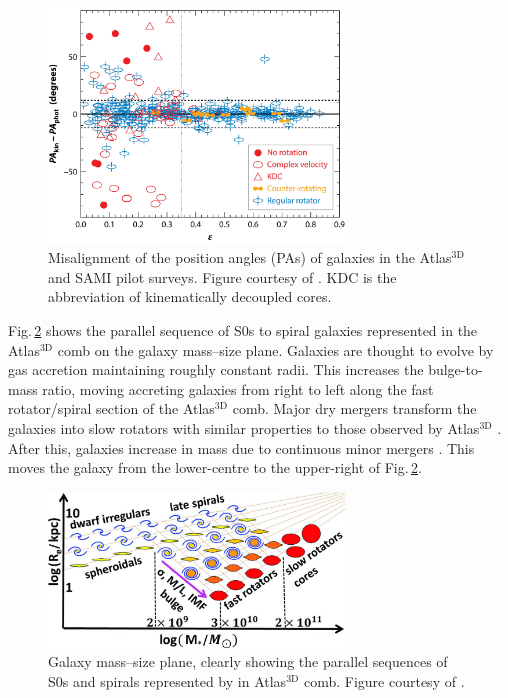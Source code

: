 	\begin{figure}
		\centering
		\includegraphics[width=0.7\textwidth]{introduction/misalignment.jpg}
		\caption[The kinematic--photometric misalignment in slow rotators]{Misalignment of the position angles (PAs) of galaxies in the Atlas$^\text{3D}$ and SAMI pilot surveys. Figure courtesy of \citet{Cappellari2016}. KDC is the abbreviation of kinematically decoupled cores.}
		\label{fig:Misalignment}
	\end{figure}

	Fig.\,\ref{fig:MassRe} shows the parallel sequence of S0s to spiral galaxies represented in the Atlas$^\text{3D}$ comb on the galaxy mass--size plane. Galaxies are thought to evolve by gas accretion maintaining roughly constant radii. This increases the bulge-to-mass ratio, moving accreting galaxies from right to left along the fast rotator/spiral section of the Atlas$^\text{3D}$ comb. Major dry mergers transform the galaxies into slow rotators \citep[e.g.][]{Bendo2000} with similar properties to those observed by Atlas$^\text{3D}$ \citep[e.g.][]{Jesseit2007, Jesseit2009}. After this, galaxies increase in mass due to continuous minor mergers \citep[e.g.][]{DeLucia2007, Genel2008, Feldmann2010, Oser2010, Feldmann2011, Hirschmann2012}. This moves the galaxy from the lower-centre to the upper-right of Fig.\,\ref{fig:MassRe}. 

	\begin{figure}
		\centering
		\includegraphics[width=0.7\textwidth]{introduction/mass_Re.jpg}
		\caption[The galaxy mass--size plane]{Galaxy mass--size plane, clearly showing the parallel sequences of S0s and spirals represented by in Atlas$^\text{3D}$ comb. Figure courtesy of \citet{Cappellari2013a}.}
		\label{fig:MassRe}
	\end{figure}


